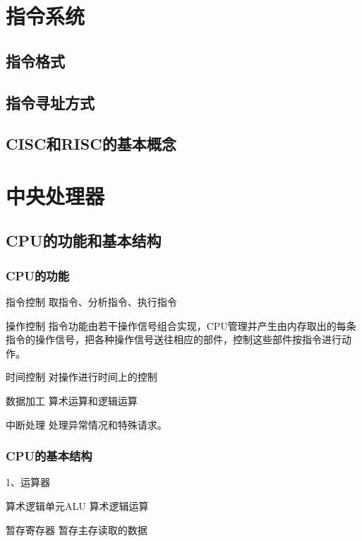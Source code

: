 \documentclass{ctexart}
\begin{document}
\section{指令系统}

\subsection{指令格式}

\subsection{指令寻址方式}

\subsection{CISC和RISC的基本概念}







\section{中央处理器}

\subsection{CPU的功能和基本结构}

\subsubsection{CPU的功能}

指令控制
取指令、分析指令、执行指令

操作控制
指令功能由若干操作信号组合实现，CPU管理并产生由内存取出的每条指令的操作信号，把各种操作信号送往相应的部件，控制这些部件按指令进行动作。

时间控制
对操作进行时间上的控制

数据加工
算术运算和逻辑运算

中断处理
处理异常情况和特殊请求。

\subsubsection{CPU的基本结构}

1、运算器

算术逻辑单元ALU
算术逻辑运算

暂存寄存器
暂存主存读取的数据
\end{document}
